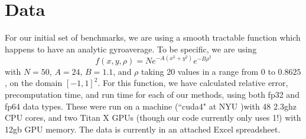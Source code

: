 \documentclass{article}
\theoremstyle{theorem}
\theoremstyle{definition}
\begin{document}
\section{Data}
For our initial set of benchmarks, we are using a smooth tractable function which happens to have an analytic gyroaverage.  To be specific, we are using
\[  f(x,y,\rho) = Ne^{-A(x^2+y^2)} e^{-B \rho^2}\]
with $N=50$, $A=24$, $B=1.1$, and $\rho$ taking 20 values in a range from $0$ to $0.8625$, on the domain $[-1,1]^2$.  For this function, we have calculated relative error, precomputation time, and run time for each of our methods, using both fp32 and fp64 data types.  These were run  on a machine (``cuda4" at NYU )with 48 2.3ghz CPU cores, and two Titan X GPUs (though our code currently only uses 1!) with 12gb GPU memory.  The data is currently in an attached Excel spreadsheet.

\vfill\eject
\end{document}
